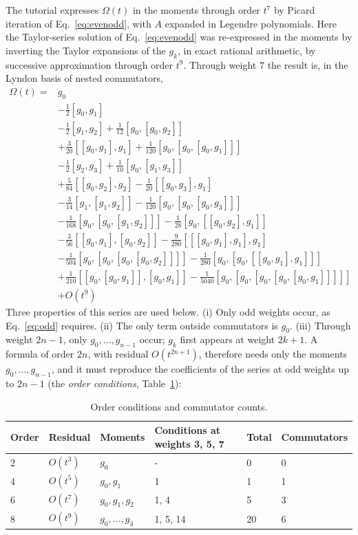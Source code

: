 \documentclass[12pt]{article}
\begin{document}
The tutorial \cite{jtut} expresses $\Omega(t)$ in the moments through order $t^7$ by Picard iteration of Eq.~\ref{eq:evenodd}, with $A$ expanded in Legendre polynomials. Here the Taylor-series solution of Eq.~\ref{eq:evenodd} was re-expressed in the moments by inverting the Taylor expansions of the $g_k$, in exact rational arithmetic, by successive approximation through order $t^9$. Through weight 7 the result is, in the Lyndon basis of nested commutators,
\begin{equation}
\begin{aligned}
\Omega(t)={}&g_{0}\\
&-\tfrac{1}{2}[g_{0},g_{1}]\\
&-\tfrac{1}{2}[g_{1},g_{2}]+\tfrac{1}{12}[g_{0},[g_{0},g_{2}]]\\
&+\tfrac{3}{20}[[g_{0},g_{1}],g_{1}]+\tfrac{1}{120}[g_{0},[g_{0},[g_{0},g_{1}]]]\\
&-\tfrac{1}{2}[g_{2},g_{3}]+\tfrac{1}{10}[g_{0},[g_{1},g_{3}]]\\
&+\tfrac{5}{84}[[g_{0},g_{2}],g_{2}]-\tfrac{1}{20}[[g_{0},g_{3}],g_{1}]\\
&-\tfrac{3}{14}[g_{1},[g_{1},g_{2}]]-\tfrac{1}{120}[g_{0},[g_{0},[g_{0},g_{3}]]]\\
&-\tfrac{1}{168}[g_{0},[g_{0},[g_{1},g_{2}]]]-\tfrac{1}{28}[g_{0},[[g_{0},g_{2}],g_{1}]]\\
&-\tfrac{3}{56}[[g_{0},g_{1}],[g_{0},g_{2}]]-\tfrac{9}{280}[[[g_{0},g_{1}],g_{1}],g_{1}]\\
&-\tfrac{1}{504}[g_{0},[g_{0},[g_{0},[g_{0},g_{2}]]]]-\tfrac{1}{280}[g_{0},[g_{0},[[g_{0},g_{1}],g_{1}]]]\\
&+\tfrac{1}{210}[[g_{0},[g_{0},g_{1}]],[g_{0},g_{1}]]-\tfrac{1}{5040}[g_{0},[g_{0},[g_{0},[g_{0},[g_{0},g_{1}]]]]]\\
&+O(t^{9})
\end{aligned}\label{eq:target}
\end{equation}
Three properties of this series are used below. (i) Only odd weights occur, as Eq.~\ref{eq:odd} requires. (ii) The only term outside commutators is $g_0$. (iii) Through weight $2n-1$, only $g_0,\ldots,g_{n-1}$ occur; $g_k$ first appears at weight $2k+1$. A formula of order $2n$, with residual $O(t^{2n+1})$, therefore needs only the moments $g_0,\ldots,g_{n-1}$, and it must reproduce the coefficients of the series at odd weights up to $2n-1$ (the \emph{order conditions}, Table~\ref{tab:conditions}):

\begin{table}[H]
\centering\small
\caption{Order conditions and commutator counts.}\label{tab:conditions}
\begin{tabular}{llllll}
\hline
Order & Residual & Moments & Conditions at weights 3, 5, 7 & Total & Commutators \\ \hline
2 & $O(t^3)$ & $g_0$ & - & 0 & 0 \\
4 & $O(t^5)$ & $g_0,g_1$ & 1 & 1 & 1 \\
6 & $O(t^7)$ & $g_0,g_1,g_2$ & 1, 4 & 5 & 3 \\
8 & $O(t^9)$ & $g_0,\ldots,g_3$ & 1, 5, 14 & 20 & 6 \\ \hline
\end{tabular}
\end{table}
\end{document}
